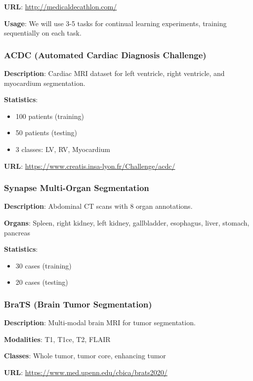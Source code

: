 \documentclass[conference]{IEEEtran}
\begin{document}
\textbf{URL}: \url{http://medicaldecathlon.com/}

\textbf{Usage}: We will use 3-5 tasks for continual learning experiments, training sequentially on each task.

\subsubsection{ACDC (Automated Cardiac Diagnosis Challenge)}

\textbf{Description}: Cardiac MRI dataset for left ventricle, right ventricle, and myocardium segmentation.

\textbf{Statistics}:
\begin{itemize}
    \item 100 patients (training)
    \item 50 patients (testing)
    \item 3 classes: LV, RV, Myocardium
\end{itemize}

\textbf{URL}: \url{https://www.creatis.insa-lyon.fr/Challenge/acdc/}

\subsubsection{Synapse Multi-Organ Segmentation}

\textbf{Description}: Abdominal CT scans with 8 organ annotations.

\textbf{Organs}: Spleen, right kidney, left kidney, gallbladder, esophagus, liver, stomach, pancreas

\textbf{Statistics}:
\begin{itemize}
    \item 30 cases (training)
    \item 20 cases (testing)
\end{itemize}

\subsubsection{BraTS (Brain Tumor Segmentation)}

\textbf{Description}: Multi-modal brain MRI for tumor segmentation.

\textbf{Modalities}: T1, T1ce, T2, FLAIR

\textbf{Classes}: Whole tumor, tumor core, enhancing tumor

\textbf{URL}: \url{https://www.med.upenn.edu/cbica/brats2020/}
\end{document}

